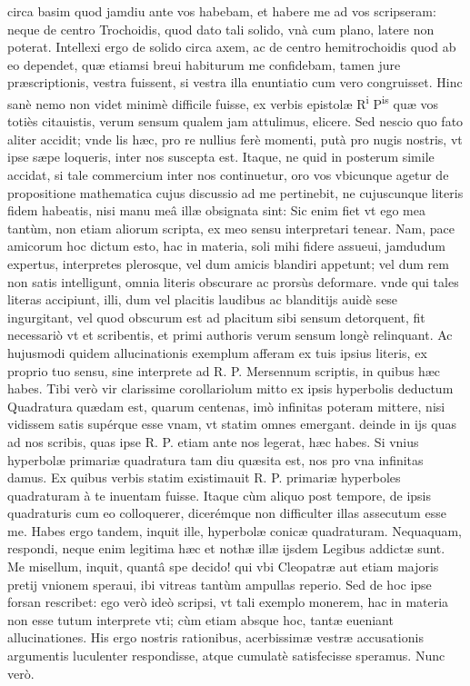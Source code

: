 \documentclass[11pt,a4paper]{article}
\begin{document}
circa basim quod jamdiu ante vos habebam, et habere me ad vos scripseram: neque de centro Trochoidis, quod dato tali solido, vnà cum plano, latere non poterat. Intellexi ergo de solido circa axem, ac de centro hemitrochoidis quod ab eo dependet, quæ etiamsi breui habiturum me confidebam, tamen jure præscriptionis, vestra fuissent, si vestra illa enuntiatio cum vero congruisset. Hinc sanè nemo non videt minimè difficile fuisse, ex verbis epistolæ R\textsuperscript{i} P\textsuperscript{is} quæ vos totiès citauistis, verum sensum qualem jam attulimus, elicere. Sed nescio quo fato aliter accidit; vnde lis hæc, pro re nullius ferè momenti, putà pro nugis nostris, vt ipse sæpe loqueris, inter nos suscepta est. Itaque, ne quid in posterum simile accidat, si tale commercium inter nos continuetur, oro vos vbicunque agetur de propositione mathematica cujus discussio ad me pertinebit, ne cujuscunque literis fidem habeatis, nisi manu meâ illæ obsignata sint: Sic enim fiet vt ego mea tantùm, non etiam aliorum scripta, ex meo sensu interpretari tenear. Nam, pace amicorum hoc dictum esto, hac in materia, soli mihi fidere assueui, jamdudum expertus, interpretes plerosque, vel dum amicis blandiri appetunt; vel dum rem non satis intelligunt, omnia literis obscurare ac prorsùs deformare. vnde qui tales literas accipiunt, illi, dum vel placitis laudibus ac blanditijs auidè sese ingurgitant, vel quod obscurum est ad placitum sibi sensum detorquent, fit necessariò vt et scribentis, et primi authoris verum sensum longè relinquant. Ac hujusmodi quidem allucinationis exemplum afferam ex tuis ipsius literis, ex proprio tuo sensu, sine interprete ad R. P. Mersennum scriptis, in quibus hæc habes. Tibi verò vir clarissime corollariolum mitto ex ipsis hyperbolis deductum Quadratura quædam est, quarum centenas, imò infinitas poteram mittere, nisi vidissem satis supérque esse vnam, vt statim omnes emergant. deinde in ijs quas ad nos scribis, quas ipse R. P. etiam ante nos legerat, hæc habes. Si vnius hyperbolæ primariæ quadratura tam diu quæsita est, nos pro vna infinitas damus. Ex quibus verbis statim existimauit R. P. primariæ hyperboles quadraturam à te inuentam fuisse. Itaque cùm aliquo post tempore, de ipsis quadraturis cum eo colloquerer, dicerémque non difficulter illas assecutum esse me. Habes ergo tandem, inquit ille, hyperbolæ conicæ quadraturam. Nequaquam, respondi, neque enim legitima hæc et nothæ illæ ijsdem Legibus addictæ sunt. Me misellum, inquit, quantâ spe decido! qui vbi Cleopatræ aut etiam majoris pretij vnionem speraui, ibi vitreas tantùm ampullas reperio. Sed de hoc ipse forsan rescribet: ego verò ideò scripsi, vt tali exemplo monerem, hac in materia non esse tutum interprete vti; cùm etiam absque hoc, tantæ eueniant allucinationes. His ergo nostris rationibus, acerbissimæ vestræ accusationis argumentis luculenter respondisse, atque cumulatè satisfecisse speramus. Nunc verò.
\end{document}
